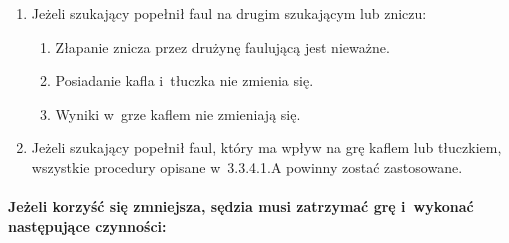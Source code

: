 \documentclass[12pt]{article}
\begin{document}
\begin{enumerate}
	      \begin{enumerate}
		      \item
		            Jeżeli szukający popełnił faul na drugim szukającym lub zniczu:

		            \begin{enumerate}
			            \item
			                  Złapanie znicza przez drużynę faulującą jest nieważne.
			            \item
			                  Posiadanie kafla i~tłuczka nie zmienia się.
			            \item
			                  Wyniki w~grze kaflem nie zmieniają się.
		            \end{enumerate}
		      \item
		            Jeżeli szukający popełnił faul, który ma wpływ na grę kaflem lub
		            tłuczkiem, wszystkie procedury opisane w~3.3.4.1.A powinny zostać
		            zastosowane.
	      \end{enumerate}
\end{enumerate}

\paragraph{Jeżeli korzyść się zmniejsza, sędzia musi
	zatrzymać grę i~wykonać następujące czynności:}
\end{document}
